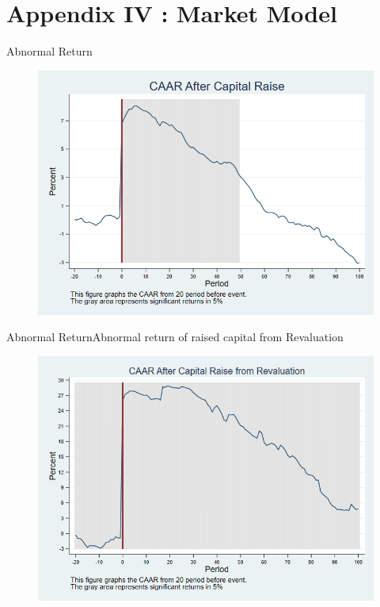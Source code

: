 \documentclass{beamer}
\begin{document}
\section{Appendix IV : Market Model }


\begin{frame}{Abnormal Return}
	\label{car_marketmodel}
	\begin{figure}
		\centering
		\includegraphics[width=0.7\linewidth]{Output/car_marketmodel.png}
		\label{fig:car_marketmodel}
	\end{figure}
\end{frame}

\begin{frame}{Abnormal Return}{Abnormal return of raised capital from Revaluation}
	\label{car_marketmodelRevaluation}
	\begin{figure}
		\centering
		\includegraphics[width=0.65\linewidth]{Output/car_marketmodelRevaluation.png}
		\label{fig:car_marketmodelRevaluation}
	\end{figure}
\end{frame}
\end{document}
